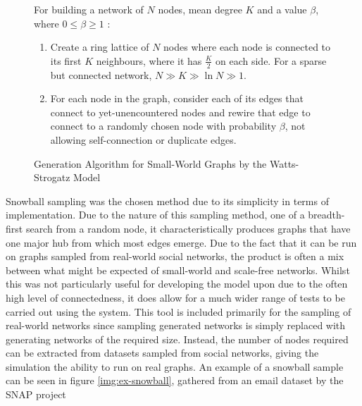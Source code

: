 \documentclass[]{report}
\begin{document}
\begin{figure}
\label{code:sw-code}
For building a network of $N$ nodes, mean degree $K$ and a value $\beta$, where $0 \leq \beta \geq 1$ :
\begin{enumerate}
\item Create a ring lattice of $N$ nodes where each node is connected to its first $K$ neighbours, where it has $\frac{K}{2}$ on each side. For a sparse but connected network, $N \gg K \gg \ln{N} \gg 1$.
\item For each node in the graph, consider each of its edges that connect to yet-unencountered nodes and rewire that edge to connect to a randomly chosen node with probability $\beta$, not allowing self-connection or duplicate edges.
\end{enumerate}
\caption{Generation Algorithm for Small-World Graphs by the Watts-Strogatz Model\cite{BAStat}}
\end{figure}

Snowball sampling was the chosen method due to its simplicity in terms of implementation. Due to the nature of this sampling method, one of a breadth-first search from a random node, it characteristically produces graphs that have one major hub from which most edges emerge. Due to the fact that it can be run on graphs sampled from real-world social networks, the product is often a mix between what might be expected of small-world and scale-free networks. Whilst this was not particularly useful for developing the model upon due to the often high level of connectedness, it does allow for a much wider range of tests to be carried out using the system. This tool is included primarily for the sampling of real-world networks since sampling generated networks is simply replaced with generating networks of the required size. Instead, the number of nodes required can be extracted from datasets sampled from social networks, giving the simulation the ability to run on real graphs. An example of a snowball sample can be seen in figure \ref{img:ex-snowball}, gathered from an email dataset by the SNAP project\cite{SNAP-email}
\end{document}
